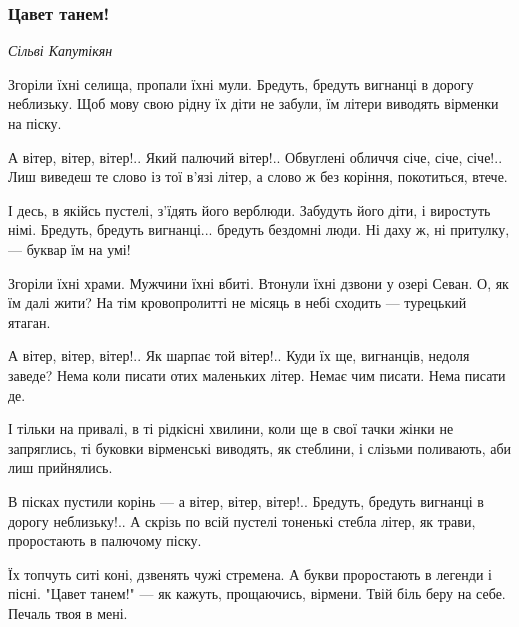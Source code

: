  
 
 

\subsubsection{Цавет танем!}
\label{sec:poetry.rus.lina_kostenko.armenia.cavet_tanem}

\obeycr
\emph{Сільві Капутікян}

Згоріли їхні селища, пропали їхні мули.
Бредуть, бредуть вигнанці в дорогу неблизьку.
Щоб мову свою рідну їх діти не забули,
їм літери виводять вірменки на піску.

А вітер, вітер, вітер!..
Який палючий вітер!..
Обвуглені обличчя січе, січе, січе!..
Лиш виведеш те слово із тої в'язі літер,
а слово ж без коріння, покотиться, втече.

І десь, в якійсь пустелі, з'їдять його верблюди.
Забудуть його діти, і виростуть німі.
Бредуть, бредуть вигнанці...
бредуть бездомні люди.
Ні даху ж, ні притулку, --- буквар їм на умі!

Згоріли їхні храми. Мужчини їхні вбиті.
Втонули їхні дзвони у озері Севан.
О, як їм далі жити? На тім кровопролитті
не місяць в небі сходить --- турецький ятаган.

А вітер, вітер, вітер!..
Як шарпає той вітер!..
Куди їх ще, вигнанців, недоля заведе?
Нема коли писати отих маленьких літер.
Немає чим писати. Нема писати де.

І тільки на привалі, в ті рідкісні хвилини,
коли ще в свої тачки жінки не запряглись,
ті буковки вірменські виводять, як стеблини,
і слізьми поливають, аби лиш прийнялись.

В пісках пустили корінь --- а вітер, вітер, вітер!..
Бредуть, бредуть вигнанці в дорогу неблизьку!..
А скрізь по всій пустелі
тоненькі стебла літер,
як трави, проростають в палючому піску.

Їх топчуть ситі коні, дзвенять чужі стремена.
А букви проростають в легенди і пісні.
"Цавет танем!" --- як кажуть, прощаючись, вірмени.
Твій біль беру на себе. Печаль твоя в мені.
\restorecr

